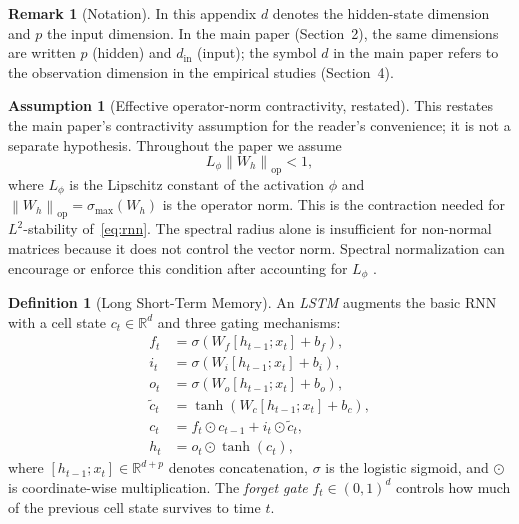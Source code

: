 \documentclass[bj,authoryear]{imsart}
\theoremstyle{plain}
\theoremstyle{definition}
\newtheorem{definition}{Definition}[section]
\newtheorem{remark}{Remark}[section]
\newtheorem{assumption}{Assumption}[section]
\newcommand{\R}{\mathbb{R}}
\newcommand{\norm}[1]{\left\lVert #1 \right\rVert}
\begin{document}
\begin{remark}[Notation]
  In this appendix $d$ denotes the hidden-state dimension and $p$ the input dimension.
  In the main paper (Section~2), the same dimensions are written $p$ (hidden) and $d_{\mathrm{in}}$ (input); the symbol $d$ in the main paper refers to the observation dimension in the empirical studies (Section~4).
\end{remark}

\begin{assumption}[Effective operator-norm contractivity, restated]
\label{ass:spectral-supp}
  This restates the main paper's contractivity assumption for the reader's
  convenience; it is not a separate hypothesis.  Throughout the paper we
  assume
  \[
    L_\phi\norm{W_h}_{\mathrm{op}}<1,
  \]
  where $L_\phi$ is the Lipschitz constant of the activation $\phi$ and
  $\norm{W_h}_{\mathrm{op}}=\sigma_{\max}(W_h)$ is the operator norm.  This is
  the contraction needed for $L^2$-stability of~\eqref{eq:rnn}.  The spectral
  radius alone is insufficient for non-normal matrices because it does not
  control the vector norm.  Spectral normalization can encourage or enforce this
  condition after accounting for $L_\phi$ \citep{miyato2018spectral}.
\end{assumption}

\begin{definition}[Long Short-Term Memory]
\label{def:lstm}
  An \emph{LSTM} \citep{hochreiter1997long} augments the basic RNN with a cell
  state $c_t \in \R^d$ and three gating mechanisms:
  \begin{align}
    f_t &= \sigma(W_f [h_{t-1}; x_t] + b_f), \label{eq:forget}\\
    i_t &= \sigma(W_i [h_{t-1}; x_t] + b_i), \label{eq:input}\\
    o_t &= \sigma(W_o [h_{t-1}; x_t] + b_o), \label{eq:output-gate}\\
    \tilde{c}_t &= \tanh(W_c [h_{t-1}; x_t] + b_c), \label{eq:candidate}\\
    c_t &= f_t \odot c_{t-1} + i_t \odot \tilde{c}_t, \label{eq:cell}\\
    h_t &= o_t \odot \tanh(c_t), \label{eq:hidden}
  \end{align}
  where $[h_{t-1};x_t]\in\R^{d+p}$ denotes concatenation, $\sigma$ is the
  logistic sigmoid, and $\odot$ is coordinate-wise multiplication.
  The \emph{forget gate} $f_t \in (0,1)^d$ controls how much of the previous
  cell state survives to time $t$.
\end{definition}
\end{document}
